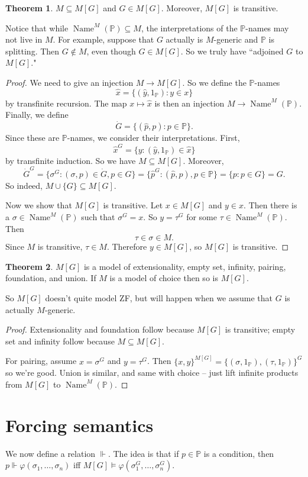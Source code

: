 \documentclass[12pt]{report}
\newcommand{\PP}{\mathbb{P}}
\DeclareMathOperator{\Name}{Name}
\theoremstyle{definition}
\newtheorem{theorem}{Theorem}[chapter]
\begin{document}
\begin{theorem}
    $M \subseteq M[G]$ and $G \in M[G]$. Moreover, $M[G]$ is transitive.
\end{theorem}
Notice that while $\Name^M(\PP) \subseteq M$, the interpretations of the $\PP$-names may not live in $M$. For example, suppose that $G$ actually is $M$-generic and $\PP$ is splitting. Then $G \notin M$, even though $G \in M[G]$. So we truly have ``adjoined $G$ to $M[G]$."
\begin{proof}
We need to give an injection $M \to M[G]$. So we define the $\PP$-names
$$\hat x = \{(\hat y, 1_\PP): y \in x\}$$
by transfinite recursion. The map $x \mapsto \hat x$ is then an injection $M \to \Name^M(\PP)$.
Finally, we define
$$\dot G = \{(\hat p, p): p \in \PP\}.$$
Since these are $\PP$-names, we consider their interpretations. First,
$$\hat x^G = \{y: (\hat y, 1_\PP) \in \hat x\}$$
by transfinite induction. So we have $M \subseteq M[G]$. Moreover,
$$\dot G^G = \{\sigma^G: (\sigma, p) \in \dot G, p \in G\} = \{\hat p^G: (\hat p, p), p \in \PP\} = \{p: p \in G\} = G.$$
So indeed, $M \cup \{G\} \subseteq M[G]$.

Now we show that $M[G]$ is transitive. Let $x \in M[G]$ and $y \in x$. Then there is a $\sigma \in \Name^M(\PP)$ such that $\sigma^G = x$. So $y = \tau^G$ for some $\tau \in \Name^M(\PP)$. Then
$$\tau \in \sigma \in M.$$
Since $M$ is transitive, $\tau \in M$. Therefore $y \in M[G]$, so $M[G]$ is transitive.
\end{proof}

\begin{theorem}
    $M[G]$ is a model of extensionality, empty set, infinity, pairing, foundation, and union. If $M$ is a model of choice then so is $M[G]$.
\end{theorem}
    So $M[G]$ doesn't quite model ZF, but will happen when we assume that $G$ is actually $M$-generic.
\begin{proof}
    Extensionality and foundation follow because $M[G]$ is transitive; empty set and infinity follow because $M \subseteq M[G]$.

    For pairing, assume $x = \sigma^G$ and $y = \tau^G$. Then $\{x, y\}^{M[G]} = \{(\sigma, 1_\PP), (\tau, 1_\PP)\}^G$ so we're good. Union is similar, and same with choice -- just lift infinite products from $M[G]$ to $\Name^M(\PP)$.
\end{proof}

\section{Forcing semantics}
We now define a relation $\Vdash$. The idea is that if $p \in \PP$ is a condition, then $p \Vdash \varphi(\sigma_1, \dots, \sigma_n)$ iff $M[G] \models \varphi(\sigma_1^G, \dots, \sigma_n^G)$.
\end{document}
